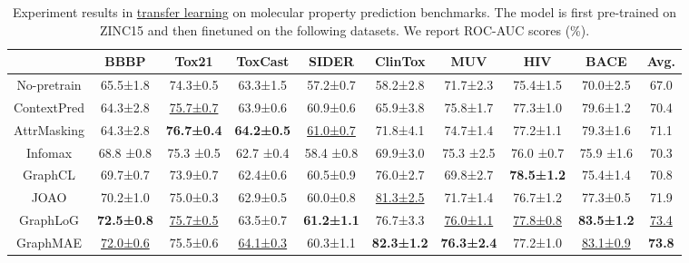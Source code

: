 \begin{table}[htp]
\caption{Experiment results in \underline{transfer learning} on molecular property prediction benchmarks. \textmd{The model is first pre-trained on ZINC15 and then finetuned on the following datasets. We report ROC-AUC scores (\%).}}
\label{tab:mol_clf}
\renewcommand\tabcolsep{8pt}
\renewcommand\arraystretch{1.05}
\begin{tabular}{c|cccccccc|c}
\toprule[1.2pt]
                        & BBBP       & Tox21      & ToxCast    & SIDER      & ClinTox    & MUV        & HIV        & BACE & Avg.      \\
\midrule
    No-pretrain         & 65.5±1.8   & 74.3±0.5   & 63.3±1.5   & 57.2±0.7   & 58.2±2.8   & 71.7±2.3   & 75.4±1.5   & 70.0±2.5 & 67.0  \\
\midrule    
    ContextPred         & 64.3±2.8   & \underline{75.7±0.7}   & 63.9±0.6   & 60.9±0.6   & 65.9±3.8   & 75.8±1.7   & 77.3±1.0   & 79.6±1.2 & 70.4 \\
    AttrMasking         & 64.3±2.8   & \bf 76.7±0.4   & \bf 64.2±0.5   &  \underline{61.0±0.7}   & 71.8±4.1   & 74.7±1.4   & 77.2±1.1   & 79.3±1.6 & 71.1 \\
    Infomax             & 68.8 ±0.8  & 75.3 ±0.5  & 62.7 ±0.4  & 58.4 ±0.8  & 69.9±3.0  & 75.3 ±2.5  & 76.0 ±0.7  & 75.9 ±1.6 & 70.3 \\
    GraphCL             & 69.7±0.7 & 73.9±0.7 & 62.4±0.6 & 60.5±0.9 & 76.0±2.7 & 69.8±2.7 & \bf 78.5±1.2 & 75.4±1.4 & 70.8 \\
    JOAO                & 70.2±1.0 & 75.0±0.3 & 62.9±0.5 & 60.0±0.8 & \underline{81.3±2.5} & 71.7±1.4 & 76.7±1.2 & 77.3±0.5 & 71.9 \\
    GraphLoG            & \bf 72.5±0.8 &  \underline{75.7±0.5}  &  63.5±0.7     & \bf 61.2±1.1  & 76.7±3.3   & \underline{76.0±1.1}    & \underline{77.8±0.8}  & \bf 83.5±1.2 & \underline{73.4} \\ 
\midrule
    GraphMAE            & \underline{72.0±0.6} & 75.5±0.6 & \underline{64.1±0.3} & 60.3±1.1 & \bf 82.3±1.2 & \bf 76.3±2.4 & 77.2±1.0 & \underline{83.1±0.9} & \bf 73.8 \\
\bottomrule[1.2pt]
\end{tabular}
\end{table}






